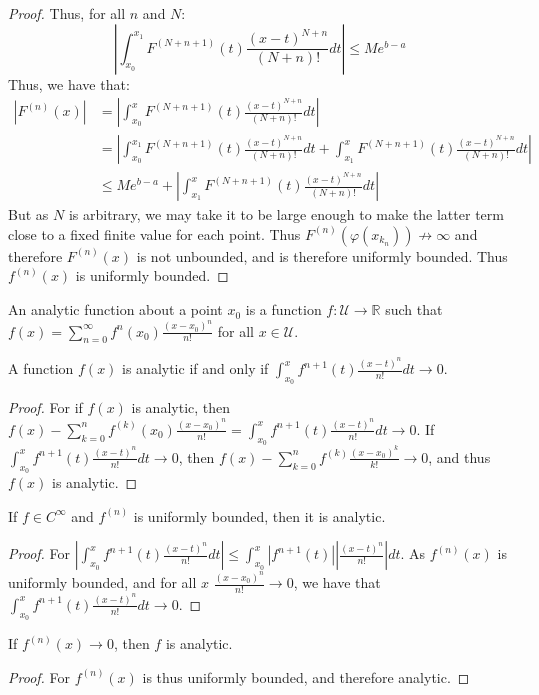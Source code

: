 \documentclass[crop=false,class=book]{standalone}
\begin{document}
\begin{proof}
Thus, for all $n$ and $N$:
\begin{equation*}
    |\int_{x_0}^{x_1} F^{(N+n+1)}(t)\frac{(x-t)^{N+n}}{(N+n)!}dt|\leq Me^{b-a}
\end{equation*}
Thus, we have that:
\begin{align*}
    |F^{(n)}(x)| &= |\int_{x_0}^{x} F^{(N+n+1)}(t)\frac{(x-t)^{N+n}}{(N+n)!}dt|\\ &= |\int_{x_0}^{x_1} F^{(N+n+1)}(t)\frac{(x-t)^{N+n}}{(N+n)!}dt+\int_{x_1}^{x} F^{(N+n+1)}(t)\frac{(x-t)^{N+n}}{(N+n)!}dt|\\
    &\leq Me^{b-a}+|\int_{x_1}^{x} F^{(N+n+1)}(t)\frac{(x-t)^{N+n}}{(N+n)!}dt|
\end{align*}
But as $N$ is arbitrary, we may take it to be large enough to make the latter term close to a fixed finite value for each point. Thus $F^{(n)}(\varphi(x_{k_n}))\not\rightarrow \infty$ and therefore $F^{(n)}(x)$ is not unbounded, and is therefore uniformly bounded. Thus $f^{(n)}(x)$ is uniformly bounded.
\end{proof}
\begin{definition}
An analytic function about a point $x_0$ is a function $f:\mathcal{U}\rightarrow\mathbb{R}$ such that $f(x) = \sum_{n=0}^{\infty} f^{n}(x_0) \frac{(x-x_0)^{n}}{n!}$ for all $x\in\mathcal{U}$.
\end{definition}
\begin{theorem}
A function $f(x)$ is analytic if and only if $\int_{x_0}^{x}f^{n+1}(t)\frac{(x-t)^n}{n!}dt\rightarrow 0$.
\end{theorem}
\begin{proof}
For if $f(x)$ is analytic, then $f(x)-\sum_{k=0}^{n} f^{(k)}(x_0)\frac{(x-x_0)^n}{n!} = \int_{x_0}^{x}f^{n+1}(t)\frac{(x-t)^n}{n!}dt \rightarrow 0$. If $\int_{x_0}^{x}f^{n+1}(t)\frac{(x-t)^n}{n!}dt\rightarrow 0$, then $f(x)-\sum_{k=0}^{n}f^{(k)}\frac{(x-x_0)^{k}}{k!}\rightarrow 0$, and thus $f(x)$ is analytic.
\end{proof}
\begin{lemma}
If $f\in C^{\infty}$ and $f^{(n)}$ is uniformly bounded, then it is analytic.
\end{lemma}
\begin{proof}
For $|\int_{x_0}^{x}f^{n+1}(t)\frac{(x-t)^n}{n!}dt|\leq \int_{x_0}^{x}|f^{n+1}(t)||\frac{(x-t)^n}{n!}|dt$. As $f^{(n)}(x)$ is uniformly bounded, and for all $x$ $\frac{(x-x_0)^n}{n!} \rightarrow 0$, we have that $\int_{x_0}^{x}f^{n+1}(t)\frac{(x-t)^n}{n!}dt\rightarrow 0$.
\end{proof}
\begin{corollary}
If $f^{(n)}(x)\rightarrow 0$, then $f$ is analytic.
\end{corollary}
\begin{proof}
For $f^{(n)}(x)$ is thus uniformly bounded, and therefore analytic.
\end{proof}
\end{document}
